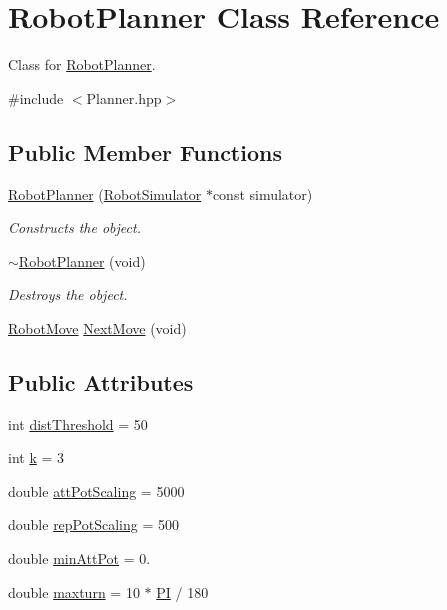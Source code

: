 \hypertarget{classRobotPlanner}{\section{Robot\-Planner Class Reference}
\label{classRobotPlanner}
}


Class for \hyperlink{classRobotPlanner}{Robot\-Planner}.  




{\ttfamily \#include $<$Planner.\-hpp$>$}

\subsection*{Public Member Functions}
\begin{DoxyCompactItemize}
\item 
\hyperlink{classRobotPlanner_a0388bc0950f92bd593a2a274c713bc35}{Robot\-Planner} (\hyperlink{classRobotSimulator}{Robot\-Simulator} $\ast$const simulator)
\begin{DoxyCompactList}\small\item\em Constructs the object. \end{DoxyCompactList}\item 
\hyperlink{classRobotPlanner_a8dfdfeb05b468c1427a3157c6467d2cd}{$\sim$\-Robot\-Planner} (void)
\begin{DoxyCompactList}\small\item\em Destroys the object. \end{DoxyCompactList}\item 
\hyperlink{structRobotMove}{Robot\-Move} \hyperlink{classRobotPlanner_a6540d24f5f096465009b18b42320bd1f}{Next\-Move} (void)
\end{DoxyCompactItemize}
\subsection*{Public Attributes}
\begin{DoxyCompactItemize}
\item 
int \hyperlink{classRobotPlanner_aa7d1571a5f12412daa58d79c518c946c}{dist\-Threshold} = 50
\item 
int \hyperlink{classRobotPlanner_a18ebcf4ba23a817db1a2fda878120eb4}{k} = 3
\item 
double \hyperlink{classRobotPlanner_aa68f0bb24256b470a8a4d13d858aef7f}{att\-Pot\-Scaling} = 5000
\item 
double \hyperlink{classRobotPlanner_a0b056d74826bddeb6dbd5a458aad0758}{rep\-Pot\-Scaling} = 500
\item 
double \hyperlink{classRobotPlanner_a199d479764e8e96c37654486ddc1ef7d}{min\-Att\-Pot} = 0.
\item 
double \hyperlink{classRobotPlanner_a8535bc45d397cf2b10e42c6ac30ddd19}{maxturn} = 10 $\ast$ \hyperlink{Actor_8hpp_a598a3330b3c21701223ee0ca14316eca}{P\-I} / 180
\end{DoxyCompactItemize}


